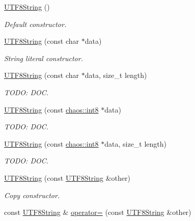 \begin{DoxyCompactItemize}
\item 
\hyperlink{classchaos_1_1str_1_1_u_t_f8_string_a173513bf2d62d742bee337b00716bf82}{U\-T\-F8\-String} ()
\begin{DoxyCompactList}\small\item\em Default constructor. \end{DoxyCompactList}\item 
\hyperlink{classchaos_1_1str_1_1_u_t_f8_string_af506696bfe777057c4a7e6b6acf19dab}{U\-T\-F8\-String} (const char $\ast$data)
\begin{DoxyCompactList}\small\item\em String literal constructor. \end{DoxyCompactList}\item 
\hyperlink{classchaos_1_1str_1_1_u_t_f8_string_ac3077c0963a5f36dcaa2a87a1c02d05d}{U\-T\-F8\-String} (const char $\ast$data, size\-\_\-t length)
\begin{DoxyCompactList}\small\item\em T\-O\-D\-O\-: D\-O\-C. \end{DoxyCompactList}\item 
\hyperlink{classchaos_1_1str_1_1_u_t_f8_string_a42f9c24b46964187a90d0da58c57949b}{U\-T\-F8\-String} (const \hyperlink{namespacechaos_a56015674cfe4ad1fc583c3da6c724d8a}{chaos\-::int8} $\ast$data)
\begin{DoxyCompactList}\small\item\em T\-O\-D\-O\-: D\-O\-C. \end{DoxyCompactList}\item 
\hyperlink{classchaos_1_1str_1_1_u_t_f8_string_a195c6d579796f70f28ab7f5b4d0e5cb5}{U\-T\-F8\-String} (const \hyperlink{namespacechaos_a56015674cfe4ad1fc583c3da6c724d8a}{chaos\-::int8} $\ast$data, size\-\_\-t length)
\begin{DoxyCompactList}\small\item\em T\-O\-D\-O\-: D\-O\-C. \end{DoxyCompactList}\item 
\hyperlink{classchaos_1_1str_1_1_u_t_f8_string_a194b76859245fdb815ce5d537f2e1db4}{U\-T\-F8\-String} (const \hyperlink{classchaos_1_1str_1_1_u_t_f8_string}{U\-T\-F8\-String} \&other)
\begin{DoxyCompactList}\small\item\em Copy constructor. \end{DoxyCompactList}\item 
const \hyperlink{classchaos_1_1str_1_1_u_t_f8_string}{U\-T\-F8\-String} \& \hyperlink{classchaos_1_1str_1_1_u_t_f8_string_a050b804cc8978a4a55a5bc0a8cad2553}{operator=} (const \hyperlink{classchaos_1_1str_1_1_u_t_f8_string}{U\-T\-F8\-String} \&other)

\end{DoxyCompactItemize}
